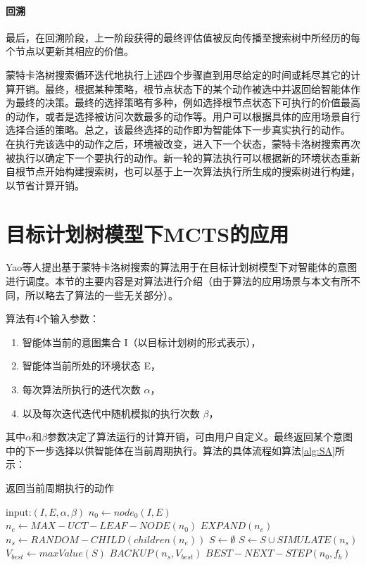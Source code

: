 \paragraph{回溯}
最后，在回溯阶段，上一阶段获得的最终评估值被反向传播至搜索树中所经历的每个节点以更新其相应的价值。

蒙特卡洛树搜索循环迭代地执行上述四个步骤直到用尽给定的时间或耗尽其它的计算开销。最终，根据某种策略，根节点状态下的某个动作被选中并返回给智能体作为最终的决策。最终的选择策略有多种，例如选择根节点状态下可执行的价值最高的动作，或者是选择被访问次数最多的动作等。用户可以根据具体的应用场景自行选择合适的策略。总之，该最终选择的动作即为智能体下一步真实执行的动作。
%
在执行完该选中的动作之后，环境被改变，进入下一个状态，蒙特卡洛树搜索再次被执行以确定下一个要执行的动作。新一轮的算法执行可以根据新的环境状态重新自根节点开始构建搜索树，也可以基于上一次算法执行所生成的搜索树进行构建，以节省计算开销。


\section{目标计划树模型下MCTS的应用}\label{SA}
Yao等人提出基于蒙特卡洛树搜索的\SA \cite{DBLP:conf/atal/YaoL16}算法用于在目标计划树模型下对智能体的意图进行调度。本节的主要内容是对\SA 算法进行介绍（由于\SA 算法的应用场景与本文有所不同，所以略去了算法的一些无关部分）。

\SA 算法有4个输入参数：
\begin{enumerate}
  \item 智能体当前的意图集合 I（以目标计划树的形式表示），
  \item 智能体当前所处的环境状态 E，
  \item 每次算法所执行的迭代次数 $\alpha$， 
  \item 以及每次迭代迭代中随机模拟的执行次数 $\beta$，
\end{enumerate}
其中$\alpha$和$\beta$参数决定了算法运行的计算开销，可由用户自定义。\SA 最终返回某个意图中的下一步选择以供智能体在当前周期执行。\SA 算法的具体流程如算法\ref{alg:SA}所示：

\begin{algorithm}
\caption{返回当前周期执行的动作}\label{alg:SA}
  \begin{algorithmic}[1]
    \STATE input:$(I, E,\alpha,\beta)$
    \STATE $n_0 \gets node_0(I,E)$ \label{root}
     \label{iteration begin}
      \STATE $n_e \gets MAX-UCT-LEAF-NODE(n_0)$ \label{selection}
      \STATE $EXPAND(n_e)$ \label{expansion}
      \STATE $n_s \gets RANDOM-CHILD(children(n_e))$ \label{simulation begin}
      \STATE $S \gets \emptyset$
        \STATE $S \gets S \cup SIMULATE(n_s)$
      \ENDFOR \label{simulation end}
      \STATE $V_{best} \gets maxValue(S)$
      \STATE $BACKUP(n_s, V_{best})$ \label{back}
      \ENDFOR \label{iteration end}
      \STATE \RETURN $BEST-NEXT-STEP(n_0, f_b)$
  \end{algorithmic}
\end{algorithm}

